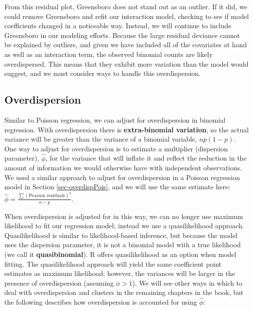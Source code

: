 \documentclass[
]{krantz}
\begin{document}
From this residual plot, Greensboro does not stand out as an outlier. If it did, we could remove Greensboro and refit our interaction model, checking to see if model coefficients changed in a noticeable way. Instead, we will continue to include Greensboro in our modeling efforts. Because the large residual deviance cannot be explained by outliers, and given we have included all of the covariates at hand as well as an interaction term, the observed binomial counts are likely overdispersed. This means that they exhibit more variation than the model would suggest, and we must consider ways to handle this overdispersion.

\subsection{Overdispersion}\label{sec-logOverdispersion}

Similar to Poisson regression, we can adjust for overdispersion  in binomial regression. With overdispersion there is \textbf{extra-binomial variation},  so the actual variance will be greater than the variance of a binomial variable, \(np(1-p)\). One way to adjust for overdispersion is to estimate a multiplier (dispersion parameter), \(\hat{\phi}\), for the variance that will inflate it and reflect the reduction in the amount of information we would otherwise have with independent observations. We used a similar approach to adjust for overdispersion in a Poisson regression model in Section \ref{sec-overdispPois}, and we will use the same estimate here: \(\hat\phi=\frac{\sum(\textrm{Pearson residuals})^2}{n-p}\).

When overdispersion is adjusted for in this way, we can no longer use maximum likelihood to fit our regression model; instead we use a quasilikelihood approach.  Quasilikelihood is similar to likelihood-based inference, but because the model uses the dispersion parameter, it is not a binomial model with a true likelihood (we call it \textbf{quasibinomial}).  R offers quasilikelihood as an option when model fitting. The quasilikelihood approach will yield the same coefficient point estimates as maximum likelihood; however, the variances will be larger in the presence of overdispersion (assuming \(\phi>1\)). We will see other ways in which to deal with overdispersion and clusters in the remaining chapters in the book, but the following describes how overdispersion is accounted for using \(\hat{\phi}\):
\vspace{5mm}
\end{document}
